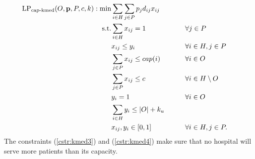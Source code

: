 \begin{alignat}{2}  
  \text{LP}_{\text{cap-kmed}}(O, \mathbf{p}, P, c, k): \min  &  \sum_{i \in H}\sum_{j \in P} p_j d_{ij} x_{ij} \nonumber\\
    \text{s.t.} & \sum_{i \in H} x_{ij} = 1    &\qquad& \forall j \in P  \\
                             &  x_{ij} \leq y_i      && \forall i \in H, j \in P \ \\
                             & \sum_{j \in P} x_{ij} \leq cap(i)      && \forall i \in O  \label{cstr:kmed3} \\
                             & \sum_{j \in P} x_{ij} \leq c      && \forall i \in H \setminus O  \label{cstr:kmed4} \\
                             & y_i = 1    && \forall i \in O  \\
                             &  \sum_{i\in H} y_{i} \leq |O|+k_u      &&  \\
                             & x_{ij},  y_i \in [0,1]&& \forall i \in H, j \in P.\nonumber
\end{alignat}
The constraints (\ref{cstr:kmed3}) and (\ref{cstr:kmed4}) make sure that no hospital will serve more patients than its capacity. 


